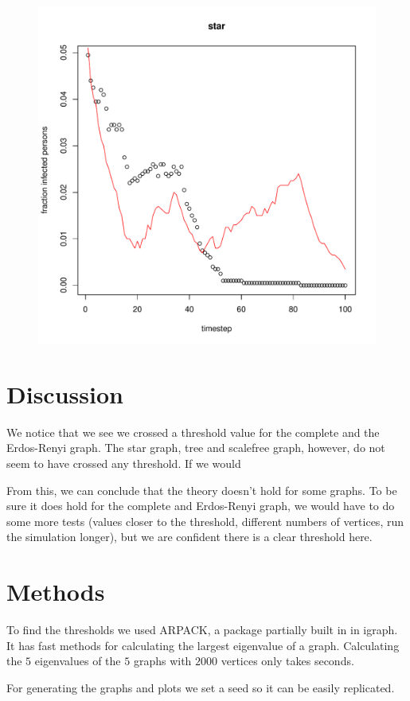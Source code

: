\documentclass[paper=a4, fontsize=11pt]{scrartcl} %
\begin{document}
\begin{figure}[htbp] %
   \centering
   \includegraphics[width=\textwidth]{thresholdSimulation_star} 
   \label{star}
\end{figure}

\section{Discussion}
We notice that we see we crossed a threshold value for the complete and the Erdos-Renyi graph. The star graph, tree and scalefree graph, however, do not seem to have crossed any threshold. If we would 

From this, we can conclude that the theory doesn't hold for some graphs. To be sure it does hold for the complete and Erdos-Renyi graph, we would have to do some more tests (values closer to the threshold, different numbers of vertices, run the simulation longer), but we are confident there is a clear threshold here.

\section{Methods}
To find the thresholds we used ARPACK, a package partially built in in igraph. It has fast methods for calculating the largest eigenvalue of a graph. Calculating the $5$ eigenvalues of the $5$ graphs with $2000$ vertices only takes seconds.

For generating the graphs and plots we set a seed so it can be easily replicated.
\end{document}
